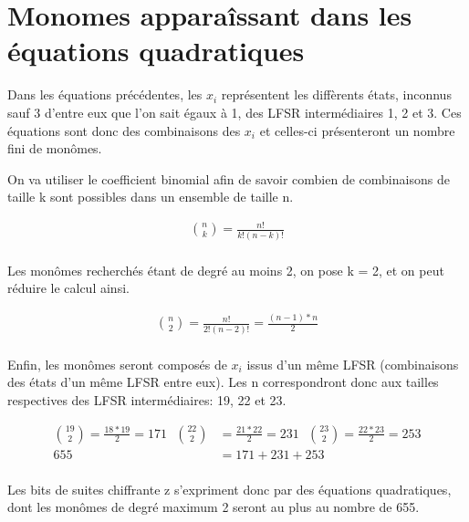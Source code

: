 \section{Monomes apparaîssant dans les équations quadratiques}

Dans les équations précédentes, les $x_i$ représentent les diffèrents états, inconnus sauf 3 d'entre eux que l'on sait égaux à 1, des LFSR intermédiaires 1, 2 et 3. Ces équations sont donc des combinaisons des $x_i$ et celles-ci présenteront un nombre fini de monômes.

On va utiliser le coefficient binomial afin de savoir combien de combinaisons de taille k sont possibles dans un ensemble de taille n.

\begin{equation}
  \begin{aligned}
    \binom{n}{k}=\frac{n!}{k!(n-k)!}\\
  \end{aligned}
\end{equation}

Les monômes recherchés étant de degré au moins 2, on pose k = 2, et on peut réduire le calcul ainsi.

\begin{equation}
  \begin{aligned}
    \binom{n}{2}=\frac{n!}{2!(n-2)!}=\frac{(n-1)*n}{2}\\
  \end{aligned}
\end{equation}

Enfin, les monômes seront composés de $x_i$ issus d'un même LFSR (combinaisons des états d'un même LFSR entre eux). Les n correspondront donc aux tailles respectives des LFSR intermédiaires: 19, 22 et 23.

\begin{equation}
  \begin{aligned}
    \binom{19}{2}=\frac{18*19}{2}=171\ \ \ \binom{22}{2}&=\frac{21*22}{2}=231\ \ \ \binom{23}{2}=\frac{22*23}{2}=253\\
    655&=171+231+253\\
  \end{aligned}
\end{equation}

Les bits de suites chiffrante z s'expriment donc par des équations quadratiques, dont les monômes de degré maximum 2 seront au plus au nombre de 655.
